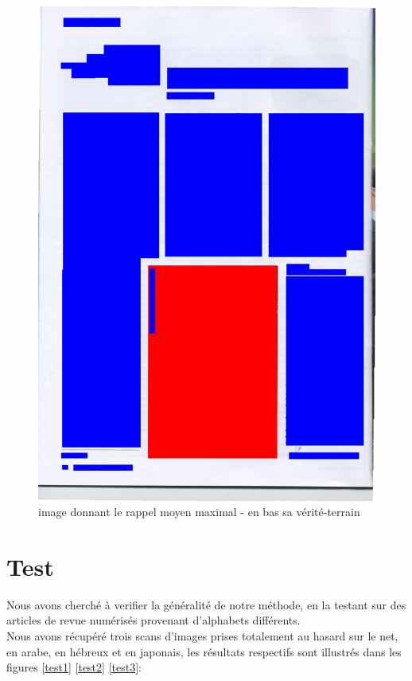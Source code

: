 \documentclass{book}
\begin{document}
\begin{figure}[H]
\begin{center}
\includegraphics[scale=0.25]{images/50_m.jpg}
\end{center}
\caption{image donnant le rappel moyen maximal - en bas sa vérité-terrain}
\label{meilleur_rappel}
\end{figure}

\clearpage

\chapter{Test}

Nous avons cherché à verifier la généralité de notre méthode, en la testant sur des articles de revue numérisés provenant d'alphabets
différents.\\
Nous avons récupéré trois scans d'images prises totalement au hasard sur le net, en arabe, en hébreux et en japonais, les résultats
respectifs sont illustrés dans les figures \ref{test1} \ref{test2} \ref{test3}:\\ 
\end{document}
